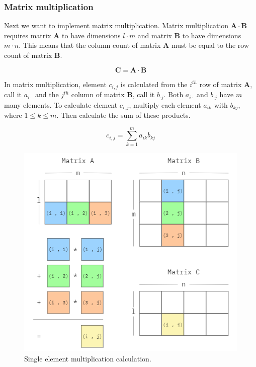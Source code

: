\subsubsection{Matrix multiplication}

Next we want to implement matrix multiplication. Matrix multiplication \(\mathbf{A} \cdot \mathbf{B}\) requires matrix \(\mathbf{A}\) to have dimensions \(l \cdot m\) and matrix \(\mathbf{B}\) to have dimensions \(m \cdot n\). This means that the column count of matrix \(\mathbf{A}\) must be equal to the row count of matrix \(\mathbf{B}\).

\[\mathbf{C} = \mathbf{A} \cdot \mathbf{B}\]

In matrix multiplication, element \(c_{i,j}\) is calculated from the $i^{th}$ row of matrix \(\mathbf{A}\), call it \(a_{i \cdot}\) and the $j^{th}$ column of matrix \(\mathbf{B}\), call it \(b_{\cdot j}\). Both \(a_{i \cdot}\) and \(b_{\cdot j}\) have $m$ many elements. To calculate element \(c_{i,j}\), multiply each element \(a_{ik}\) with \(b_{kj}\), where $1 \leq k \leq m$. Then calculate the sum of these products.

\[c_{i,j} = \sum_{k=1}^m a_{ik} b_{kj}\]

\begin{figure}[H]
\includegraphics[scale=.65]{Documents/Report/Figures/MatrixMultiplication.png}
\centering
\caption{Single element multiplication calculation.}
\label{fig:multiplication_illustration}
\end{figure}

